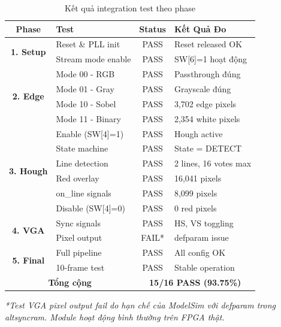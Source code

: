 \documentclass[12pt,a4paper]{report}
\begin{document}
\begin{table}[H]
\centering
\caption{Kết quả integration test theo phase}
\label{tab:integration_test}
\begin{tabular}{|c|l|c|l|}
\hline
\textbf{Phase} & \textbf{Test} & \textbf{Status} & \textbf{Kết Quả Đo} \\
\hline
\multirow{2}{*}{\textbf{1. Setup}} 
& Reset \& PLL init & \cellcolor{passgreen!30}PASS & Reset released OK \\
& Stream mode enable & \cellcolor{passgreen!30}PASS & SW[6]=1 hoạt động \\
\hline
\multirow{4}{*}{\textbf{2. Edge}}
& Mode 00 - RGB & \cellcolor{passgreen!30}PASS & Passthrough đúng \\
& Mode 01 - Gray & \cellcolor{passgreen!30}PASS & Grayscale đúng \\
& Mode 10 - Sobel & \cellcolor{passgreen!30}PASS & 3,702 edge pixels \\
& Mode 11 - Binary & \cellcolor{passgreen!30}PASS & 2,354 white pixels \\
\hline
\multirow{6}{*}{\textbf{3. Hough}}
& Enable (SW[4]=1) & \cellcolor{passgreen!30}PASS & Hough active \\
& State machine & \cellcolor{passgreen!30}PASS & State = DETECT \\
& Line detection & \cellcolor{passgreen!30}PASS & 2 lines, 16 votes max \\
& Red overlay & \cellcolor{passgreen!30}PASS & 16,041 pixels \\
& on\_line signals & \cellcolor{passgreen!30}PASS & 8,099 pixels \\
& Disable (SW[4]=0) & \cellcolor{passgreen!30}PASS & 0 red pixels \\
\hline
\multirow{2}{*}{\textbf{4. VGA}}
& Sync signals & \cellcolor{passgreen!30}PASS & HS, VS toggling \\
& Pixel output & \cellcolor{failred!30}FAIL* & defparam issue \\
\hline
\multirow{2}{*}{\textbf{5. Final}}
& Full pipeline & \cellcolor{passgreen!30}PASS & All config OK \\
& 10-frame test & \cellcolor{passgreen!30}PASS & Stable operation \\
\hline
\multicolumn{2}{|c|}{\textbf{Tổng cộng}} & \multicolumn{2}{c|}{\textbf{15/16 PASS (93.75\%)}} \\
\hline
\end{tabular}
\end{table}

\textit{*Test VGA pixel output fail do hạn chế của ModelSim với defparam trong altsyncram. Module hoạt động bình thường trên FPGA thật.}
\end{document}
